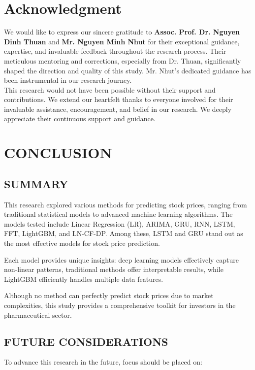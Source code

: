 \documentclass{ieeeojies}
\begin{document}
\section*{Acknowledgment}
We would like to express our sincere gratitude to \textbf{Assoc. Prof. Dr. Nguyen Dinh Thuan} and \textbf{Mr. Nguyen Minh Nhut} for their exceptional guidance, expertise, and invaluable feedback throughout the research process. Their meticulous mentoring and corrections, especially from Dr. Thuan, significantly shaped the direction and quality of this study. Mr. Nhut's dedicated guidance has been instrumental in our research journey.
\\This research would not have been possible without their support and contributions. We extend our heartfelt thanks to everyone involved for their invaluable assistance, encouragement, and belief in our research. We deeply appreciate their continuous support and guidance.

\section{CONCLUSION}

\subsection{SUMMARY}

This research explored various methods for predicting stock prices, ranging from traditional statistical models to advanced machine learning algorithms. The models tested include Linear Regression (LR), ARIMA, GRU, RNN, LSTM, FFT, LightGBM, and LN-CF-DP. Among these, LSTM and GRU stand out as the most effective models for stock price prediction.

Each model provides unique insights: deep learning models effectively capture non-linear patterns, traditional methods offer interpretable results, while LightGBM efficiently handles multiple data features.

Although no method can perfectly predict stock prices due to market complexities, this study provides a comprehensive toolkit for investors in the pharmaceutical sector.

\subsection{FUTURE CONSIDERATIONS}

To advance this research in the future, focus should be placed on:
\end{document}
